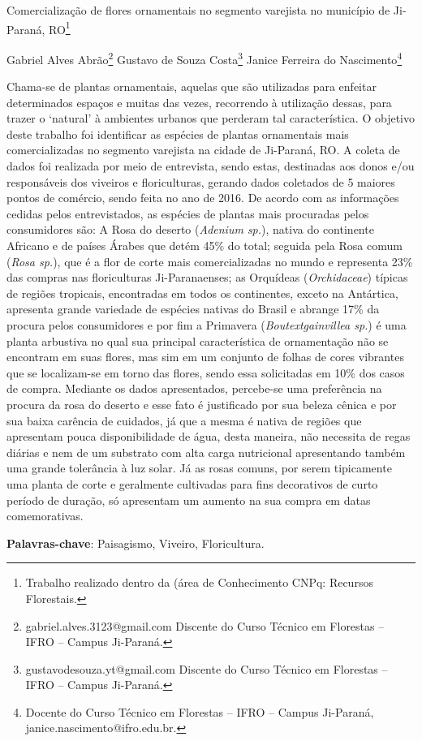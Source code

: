 \documentclass[article,12pt,onesidea,4paper,english,brazil]{abntex2}
\begin{document}
	
	
	\frenchspacing 
	
	\begin{center}
		\LARGE Comercialização de flores ornamentais no segmento varejista no
		município de Ji-Paraná, RO\footnote{Trabalho realizado dentro da (área de Conhecimento CNPq: Recursos Florestais.}
		
		\normalsize
		Gabriel Alves Abrão\footnote{gabriel.alves.3123@gmail.com Discente do Curso Técnico em Florestas – IFRO – Campus
			Ji-Paraná.} 
	Gustavo de Souza Costa\footnote{gustavodesouza.yt@gmail.com Discente do Curso Técnico em Florestas – IFRO – Campus
		Ji-Paraná.} 
	Janice Ferreira do Nascimento\footnote{Docente do Curso Técnico em Florestas – IFRO – Campus Ji-Paraná,
		janice.nascimento@ifro.edu.br.} 
	
	\end{center}
	
	\noindent Chama-se de plantas ornamentais, aquelas que são utilizadas para enfeitar determinados
	espaços e muitas das vezes, recorrendo à utilização dessas, para trazer o ‘natural’ à ambientes
	urbanos que perderam tal característica. O objetivo deste trabalho foi identificar as espécies de
	plantas ornamentais mais comercializadas no segmento varejista na cidade de Ji-Paraná, RO.
	A coleta de dados foi realizada por meio de entrevista, sendo estas, destinadas aos donos e/ou
	responsáveis dos viveiros e floriculturas, gerando dados coletados de 5 maiores pontos de
	comércio, sendo feita no ano de 2016. De acordo com as informações cedidas pelos
	entrevistados, as espécies de plantas mais procuradas pelos consumidores são: A Rosa do
	deserto (\textit{Adenium sp.}), nativa do continente Africano e de países Árabes que detém 45\% do
	total; seguida pela Rosa comum (\textit{Rosa sp.}), que é a flor de corte mais comercializadas no
	mundo e representa 23\% das compras nas floriculturas Ji-Paranaenses; as Orquídeas
	(\textit{Orchidaceae}) típicas de regiões tropicais, encontradas em todos os continentes, exceto na
	Antártica, apresenta grande variedade de espécies nativas do Brasil e abrange 17\% da procura
	pelos consumidores e por fim a Primavera (\textit{Boutextgainvillea sp.}) é uma planta arbustiva no qual
	sua principal característica de ornamentação não se encontram em suas flores, mas sim em
	um conjunto de folhas de cores vibrantes que se localizam-se em torno das flores, sendo essa
	solicitadas em 10\% dos casos de compra. Mediante os dados apresentados, percebe-se uma
	preferência na procura da rosa do deserto e esse fato é justificado por sua beleza cênica e por
	sua baixa carência de cuidados, já que a mesma é nativa de regiões que apresentam pouca
	disponibilidade de água, desta maneira, não necessita de regas diárias e nem de um substrato
	com alta carga nutricional apresentando também uma grande tolerância à luz solar. Já as rosas
	comuns, por serem tipicamente uma planta de corte e geralmente cultivadas para fins
	decorativos de curto período de duração, só apresentam um aumento na sua compra em datas
	comemorativas.
	
	\vspace{\onelineskip}
	
	\noindent
	\textbf{Palavras-chave}: Paisagismo, Viveiro, Floricultura.
	
\end{document}
